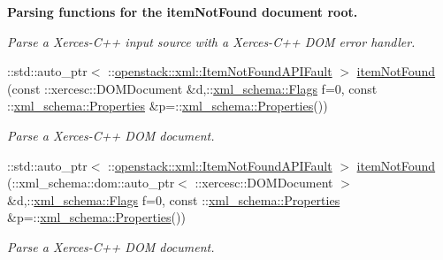 \begin{Indent}{\bf Parsing functions for the itemNotFound document root.}
\begin{DoxyCompactItemize}
\begin{DoxyCompactList}\small\item\em Parse a Xerces-\/C++ input source with a Xerces-\/C++ DOM error handler. \item\end{DoxyCompactList}\item 
::std::auto\_\-ptr$<$ ::\hyperlink{classopenstack_1_1xml_1_1ItemNotFoundAPIFault}{openstack::xml::ItemNotFoundAPIFault} $>$ \hyperlink{namespaceopenstack_1_1xml_a6e91b6be5be17a59c105df46c2f04351}{itemNotFound} (const ::xercesc::DOMDocument \&d,::\hyperlink{namespacexml__schema_affb4c227cbd9aa7453dd1dc5a1401943}{xml\_\-schema::Flags} f=0, const ::\hyperlink{namespacexml__schema_ad27ce19a7ee1d3b1064092648898f64c}{xml\_\-schema::Properties} \&p=::\hyperlink{namespacexml__schema_ad27ce19a7ee1d3b1064092648898f64c}{xml\_\-schema::Properties}())
\begin{DoxyCompactList}\small\item\em Parse a Xerces-\/C++ DOM document. \item\end{DoxyCompactList}\item 
::std::auto\_\-ptr$<$ ::\hyperlink{classopenstack_1_1xml_1_1ItemNotFoundAPIFault}{openstack::xml::ItemNotFoundAPIFault} $>$ \hyperlink{namespaceopenstack_1_1xml_a4567244a6e898547cbf736415dbe36ee}{itemNotFound} (::xml\_\-schema::dom::auto\_\-ptr$<$ ::xercesc::DOMDocument $>$ \&d,::\hyperlink{namespacexml__schema_affb4c227cbd9aa7453dd1dc5a1401943}{xml\_\-schema::Flags} f=0, const ::\hyperlink{namespacexml__schema_ad27ce19a7ee1d3b1064092648898f64c}{xml\_\-schema::Properties} \&p=::\hyperlink{namespacexml__schema_ad27ce19a7ee1d3b1064092648898f64c}{xml\_\-schema::Properties}())
\begin{DoxyCompactList}\small\item\em Parse a Xerces-\/C++ DOM document. \item\end{DoxyCompactList}\end{DoxyCompactItemize}
\end{Indent}
